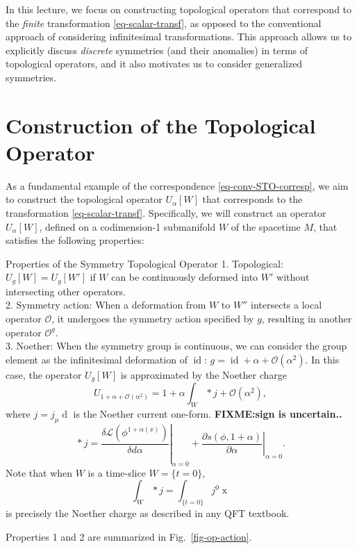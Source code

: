\documentclass[11pt,toc=bibliography]{scrbook}
\DeclareMathOperator{\id}{id}
\newcommand{\stdim}{D}
\numberwithin{equation}{section}
\begin{document}
\begin{note}{}
In this lecture, we focus on constructing topological operators that correspond to the \textit{finite} transformation \eqref{eq-scalar-transf}, as opposed to the conventional approach of considering infinitesimal transformations. This approach allows us to explicitly discuss \textit{discrete} symmetries (and their anomalies) in terms of topological operators, and it also motivates us to consider generalized symmetries.
\end{note}

\section{Construction of the Topological Operator}
As a fundamental example of the correspondence \eqref{eq-conv-STO-corresp}, we aim to construct the topological operator $U_\alpha[W]$ that corresponds to the transformation \eqref{eq-scalar-transf}. Specifically, we will construct an operator $U_\alpha[W]$, defined on a codimension-1 submanifold $W$ of the spacetime $M$, that satisfies the following properties:

\begin{important}
{Properties of the Symmetry Topological Operator}
1. Topological: $U_g[W] = U_g[W']$ if $W$ can be continuously deformed into $W'$ without intersecting other operators. \\
2. Symmetry action: When a deformation from $W$ to $W''$ intersects a local operator $\mathcal{O}$, it undergoes the symmetry action specified by $g$, resulting in another operator $\mathcal{O}^g$. \\
3. Noether: When the symmetry group is continuous, we can consider the group element as the infinitesimal deformation of $\id$: $g = \id + \alpha + \mathcal{O}(\alpha^2)$. In this case, the operator $U_g[W]$ is approximated by the Noether charge
    \begin{equation}
    U_{1+\alpha+\mathcal{O}(\alpha^2)} = 1 + \alpha \int_W \mathop{*}j +\mathcal{O}(\alpha^2),
    \label{eq-Noether-approx}
    \end{equation}
    where $j = j_\mu\mathop{dx^\mu}$ is the Noether current one-form. \textbf{FIXME:sign is uncertain..}
    \begin{equation}
    \mathop{*}j = \left.\frac{\delta\mathcal{L}(\phi^{1+\alpha(x)})}{\delta d\alpha}\right|_{\alpha=0} + \left.\frac{\partial s(\phi, 1+ \alpha)}{\partial \alpha}\right|_{\alpha=0}.
    \end{equation}
Note that when $W$ is a time-slice $W=\{t=0\}$,
\begin{equation}
\int_W \mathop{*} j = \int_{\{t=0\}} j^0 \mathop{d^{\stdim-1}x}
\end{equation}
is precisely the Noether charge as described in any QFT textbook.

Properties 1 and 2 are summarized in Fig.~\ref{fig-op-action}.
\end{important}
\end{document}
